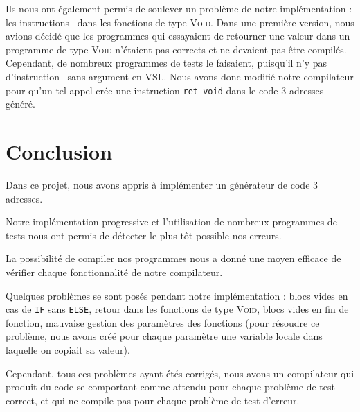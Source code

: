 \documentclass[french]{article}
\begin{document}
Ils nous ont également permis de soulever un problème de notre implémentation : les instructions \return\ dans les fonctions de type \textsc{Void}. Dans une première version, nous avions décidé que les programmes qui essayaient de retourner une valeur dans un programme de type \textsc{Void} n'étaient pas corrects et ne devaient pas être compilés. Cependant, de nombreux programmes de tests le faisaient, puisqu'il n'y pas d'instruction \return\ sans argument en VSL. Nous avons donc modifié notre compilateur pour qu'un tel appel crée une instruction \texttt{ret void} dans le code 3 adresses généré.

\section{Conclusion}
Dans ce projet, nous avons appris à implémenter un générateur de code 3 adresses.

Notre implémentation progressive et l'utilisation de nombreux programmes de tests nous ont permis de détecter le plus tôt possible nos erreurs.

La possibilité de compiler nos programmes nous a donné une moyen efficace de vérifier chaque fonctionnalité de notre compilateur.

Quelques problèmes se sont posés pendant notre implémentation : blocs vides en cas de \texttt{IF} sans \texttt{ELSE}, retour dans les fonctions de type \textsc{Void}, blocs vides en fin de fonction, mauvaise gestion des paramètres des fonctions (pour résoudre ce problème, nous avons créé pour chaque paramètre une variable locale dans laquelle on copiait sa valeur).

Cependant, tous ces problèmes ayant étés corrigés, nous avons un compilateur qui produit du code se comportant comme attendu pour chaque problème de test correct, et qui ne compile pas pour chaque problème de test d'erreur.
\end{document}
